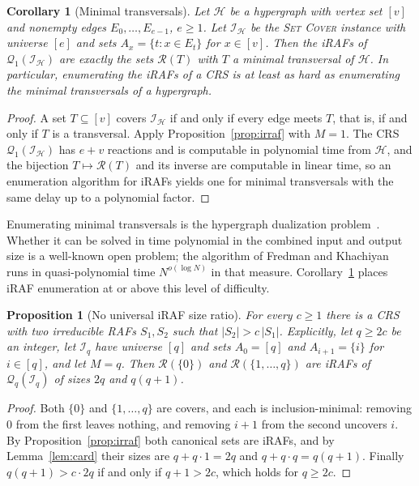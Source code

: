 \documentclass[11pt,a4paper]{article}
\theoremstyle{plain}
\newtheorem{proposition}[theorem]{Proposition}
\newtheorem{corollary}[theorem]{Corollary}
\theoremstyle{definition}
\theoremstyle{remark}
\newcommand{\cQ}{\mathcal{Q}}
\newcommand{\cR}{\mathcal{R}}
\newcommand{\cI}{\mathcal{I}}
\newcommand{\cH}{\mathcal{H}}
\newcommand{\SetCover}{\textup{\textsc{Set Cover}}}
\begin{document}
\begin{corollary}[Minimal transversals]\label{cor:transversal}
Let $\cH$ be a hypergraph with vertex set $[v]$ and nonempty edges $E_0,\dots,E_{e-1}$, $e\ge 1$. Let $\cI_\cH$ be the \SetCover{} instance with universe $[e]$ and sets $A_x=\{t: x\in E_t\}$ for $x\in[v]$. Then the iRAFs of $\cQ_1(\cI_\cH)$ are exactly the sets $\cR(T)$ with $T$ a minimal transversal of $\cH$. In particular, enumerating the iRAFs of a CRS is at least as hard as enumerating the minimal transversals of a hypergraph.
\end{corollary}

\begin{proof}
A set $T\subseteq[v]$ covers $\cI_\cH$ if and only if every edge meets $T$, that is, if and only if $T$ is a transversal. Apply Proposition~\ref{prop:irraf} with $M=1$. The CRS $\cQ_1(\cI_\cH)$ has $e+v$ reactions and is computable in polynomial time from $\cH$, and the bijection $T\mapsto\cR(T)$ and its inverse are computable in linear time, so an enumeration algorithm for iRAFs yields one for minimal transversals with the same delay up to a polynomial factor.
\end{proof}

Enumerating minimal transversals is the hypergraph dualization problem~\cite{eiter1995identifying}. Whether it can be solved in time polynomial in the combined input and output size is a well-known open problem; the algorithm of Fredman and Khachiyan~\cite{fredman1996complexity} runs in quasi-polynomial time $N^{o(\log N)}$ in that measure. Corollary~\ref{cor:transversal} places iRAF enumeration at or above this level of difficulty.

\begin{proposition}[No universal iRAF size ratio]\label{prop:unbounded}
For every $c\ge 1$ there is a CRS with two irreducible RAFs $S_1,S_2$ such that $|S_2|>c\,|S_1|$. Explicitly, let $q\ge 2c$ be an integer, let $\cI_q$ have universe $[q]$ and sets $A_0=[q]$ and $A_{i+1}=\{i\}$ for $i\in[q]$, and let $M=q$. Then $\cR(\{0\})$ and $\cR(\{1,\dots,q\})$ are iRAFs of $\cQ_q(\cI_q)$ of sizes $2q$ and $q(q+1)$.
\end{proposition}

\begin{proof}
Both $\{0\}$ and $\{1,\dots,q\}$ are covers, and each is inclusion-minimal: removing $0$ from the first leaves nothing, and removing $i+1$ from the second uncovers $i$. By Proposition~\ref{prop:irraf} both canonical sets are iRAFs, and by Lemma~\ref{lem:card} their sizes are $q+q\cdot 1=2q$ and $q+q\cdot q=q(q+1)$. Finally $q(q+1)>c\cdot 2q$ if and only if $q+1>2c$, which holds for $q\ge 2c$.
\end{proof}
\end{document}
